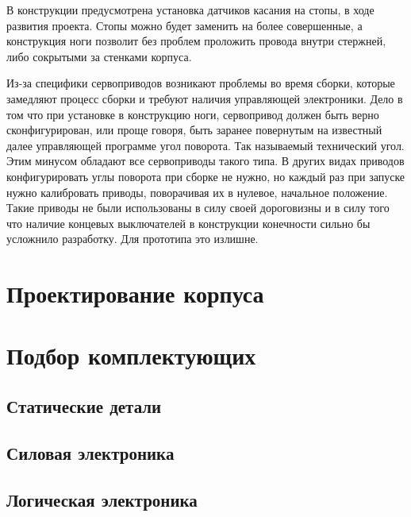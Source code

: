 В конструкции предусмотрена установка датчиков касания на стопы, в ходе развития проекта. Стопы можно будет заменить на более совершенные, а конструкция ноги позволит без проблем проложить провода внутри стержней, либо сокрытыми за стенками корпуса.

Из-за специфики сервоприводов возникают проблемы во время сборки, которые замедляют процесс сборки и требуют наличия управляющей электроники. Дело в том что при установке в конструкцию ноги, сервопривод должен быть верно сконфигурирован, или проще говоря, быть заранее повернутым на известный далее управляющей программе угол поворота. Так называемый технический угол. Этим минусом обладают все сервоприводы такого типа. В других видах приводов конфигурировать углы поворота при сборке не нужно, но каждый раз при запуске нужно калибровать приводы, поворачивая их в нулевое, начальное положение. Такие приводы не были использованы в силу своей дороговизны и в силу того что наличие концевых выключателей в конструкции конечности сильно бы усложнило разработку. Для прототипа это излишне.

\section{Проектирование корпуса}

\section{Подбор комплектующих}
\subsection{Статические детали}

\subsection{Силовая электроника}

\subsection{Логическая электроника}